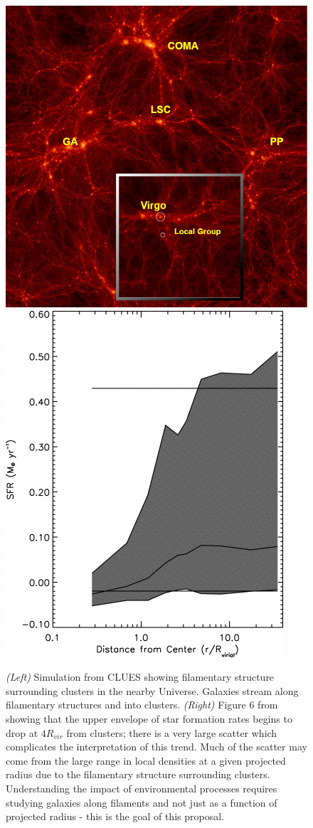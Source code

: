 \documentclass[11pt, preprint]{aastex}
\begin{document}

 \begin{figure}[h]
   \centering
 \includegraphics[width=.48\textwidth]{CLUES-DM.png}
\includegraphics[width=.39\textwidth]{gomez2003-fg6a.png}
   \caption{\small  {\it (Left) } Simulation from CLUES showing
     filamentary structure surrounding clusters in the nearby
     Universe.  Galaxies stream along filamentary structures and into clusters.
{\it (Right)}  Figure 6 from \citet{gomez03} showing that the upper
envelope of star formation rates begins to drop at $4R_{vir}$ from clusters;  there is a very
large scatter which complicates the interpretation of this trend.   Much
of the scatter may come from the large range in local densities at a given
projected radius due to the filamentary structure surrounding clusters.
Understanding the impact of environmental processes requires studying galaxies along
filaments and not just as a function of projected radius - this is the goal of this proposal.}
     \label{fig1}
 \end{figure}
\end{document}

